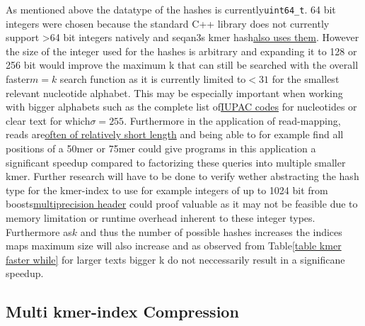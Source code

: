 As mentioned above the datatype of the hashes is currently\lstinline{uint64_t}.
64 bit integers were chosen because the standard C++ library does
not currently support >64 bit integers natively and seqan3s kmer hash\href{http://docs.seqan.de/seqan/3-master-user/group__views.html\#ga6e598d6a021868f704d39df73252974f}{also uses them}.
However the size of the integer used for the hashes is arbitrary and
expanding it to 128 or 256 bit would improve the maximum k that can
still be searched with the overall faster$m=k$ search function as
it is currently limited to$<31$ for the smallest relevant nucleotide
alphabet. This may be especially important when working with bigger
alphabets such as the complete list of\href{https://www.bioinformatics.org/sms/iupac.html}{IUPAC codes}
for nucleotides or clear text for which$\sigma=255$. Furthermore
in the application of read-mapping, reads are\href{https://www.illumina.com/science/technology/next-generation-sequencing/plan-experiments/read-length.html}{often of relatively short length}
and being able to for example find all positions of a 50mer or 75mer
could give programs in this application a significant speedup compared
to factorizing these queries into multiple smaller kmer. Further research
will have to be done to verify wether abstracting the hash type for
the kmer-index to use for example integers of up to 1024 bit from
boosts\href{https://www.boost.org/doc/libs/1_62_0/libs/multiprecision/doc/html/boost_multiprecision/tut/ints/cpp_int.html}{multiprecision header}
could proof valuable as it may not be feasible due to memory limitation
or runtime overhead inherent to these integer types. Furthermore as$k$
and thus the number of possible hashes increases the indices maps
maximum size will also increase and as observed from Table\ref{table kmer faster while}
for larger texts bigger k do not neccessarily result in a significane
speedup.

\subsection{Multi kmer-index Compression}

